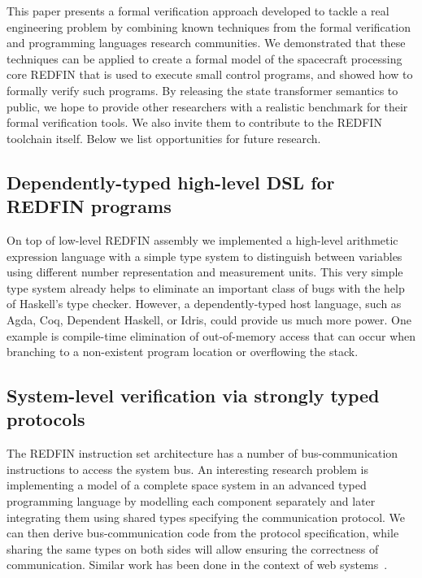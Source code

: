 This paper presents a formal verification approach developed to tackle a real
engineering problem by combining known techniques from the formal verification
and programming languages research communities. We demonstrated that these
techniques can be applied to create a formal model of the spacecraft processing
core REDFIN that is used to execute small control programs, and showed how to
formally verify such programs. By releasing the state transformer semantics to
public, we hope to provide other researchers with a realistic benchmark for
their formal verification tools. We also invite them to contribute to the
REDFIN toolchain itself. Below we list opportunities for future research.

\subsection{Dependently-typed high-level DSL for REDFIN programs}

On top of low-level REDFIN assembly we implemented a high-level arithmetic
expression language with a simple type system to distinguish between variables
using different number representation and measurement units. This very simple
type system already helps to eliminate an important class of bugs
with the help of Haskell's type checker. However, a dependently-typed host language,
such as Agda, Coq, Dependent Haskell, or Idris, could provide us much more power.
One example is compile-time elimination of out-of-memory access that can occur
when branching to a non-existent program location or overflowing the stack.

\subsection{System-level verification via strongly typed protocols}

The REDFIN instruction set architecture has a number of bus-communication instructions
to access the system bus. An interesting research problem is implementing a
model of a complete space system in an advanced typed programming language by modelling
each component separately and later integrating them using shared types specifying
the communication protocol. We can then derive bus-communication code
from the protocol specification, while sharing the same types on both sides will
allow ensuring the correctness of communication. Similar work has been
done in the context of web systems~\cite{Mestanogullari:2015:TWA:2808098.2808099}.

